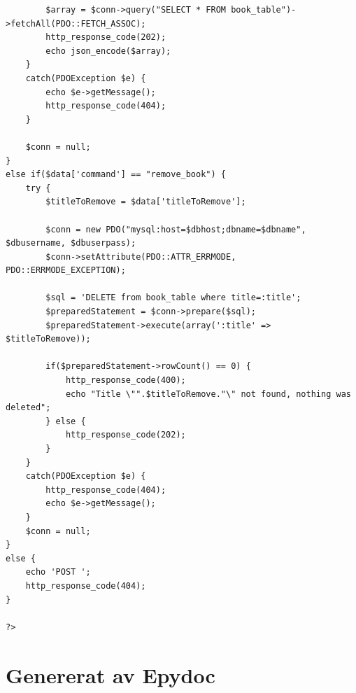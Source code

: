 \documentclass[11pt, titlepage, oneside, a4paper]{article}
\begin{document}
\begin{lstlisting}
		$array = $conn->query("SELECT * FROM book_table")->fetchAll(PDO::FETCH_ASSOC);
		http_response_code(202);
		echo json_encode($array);
	}
	catch(PDOException $e) {
		echo $e->getMessage();
		http_response_code(404);
	}

	$conn = null;
}
else if($data['command'] == "remove_book") {
	try {
		$titleToRemove = $data['titleToRemove'];

		$conn = new PDO("mysql:host=$dbhost;dbname=$dbname", $dbusername, $dbuserpass);
		$conn->setAttribute(PDO::ATTR_ERRMODE, PDO::ERRMODE_EXCEPTION);
		
		$sql = 'DELETE from book_table where title=:title';
		$preparedStatement = $conn->prepare($sql);
		$preparedStatement->execute(array(':title' => $titleToRemove));
		
		if($preparedStatement->rowCount() == 0) {
			http_response_code(400);
			echo "Title \"".$titleToRemove."\" not found, nothing was deleted";
		} else {
			http_response_code(202);
		}
	}
	catch(PDOException $e) {
		http_response_code(404);
		echo $e->getMessage();
	}
	$conn = null;
}
else {
	echo 'POST ';
	http_response_code(404);
}

?>
        \end{lstlisting}
        
        \part{Genererat av Epydoc}
        
		
		
        
        
        
       
        
        
        
        
\end{document}
